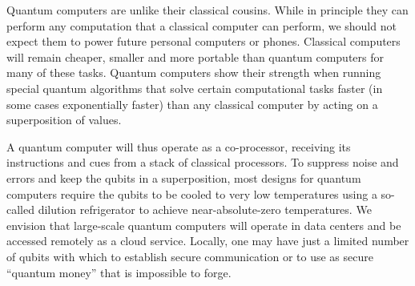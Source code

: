 \documentclass[journal]{IEEEtran}
\begin{document}
Quantum computers are unlike their classical cousins.  While in principle they can perform any computation that a classical computer can perform, we should not expect them to power future personal computers or phones. Classical computers will remain cheaper, smaller and more portable than quantum computers for many of these tasks. Quantum computers show their strength when running special quantum algorithms that solve certain computational tasks faster (in some cases exponentially faster) than any classical computer by acting on a superposition of values.  
%

A quantum computer will thus operate as a co-processor, receiving its instructions and cues from a stack of classical processors. To suppress noise and errors and keep the qubits in a superposition, most designs for quantum computers require the qubits to be cooled to very low temperatures using a so-called dilution refrigerator to achieve near-absolute-zero temperatures.
We envision that large-scale quantum computers will operate in data centers and be accessed remotely as a cloud service. Locally, one may have just a limited number of qubits with which to establish secure communication or to use as secure ``quantum money'' that is impossible to forge.
%
%
\end{document}
